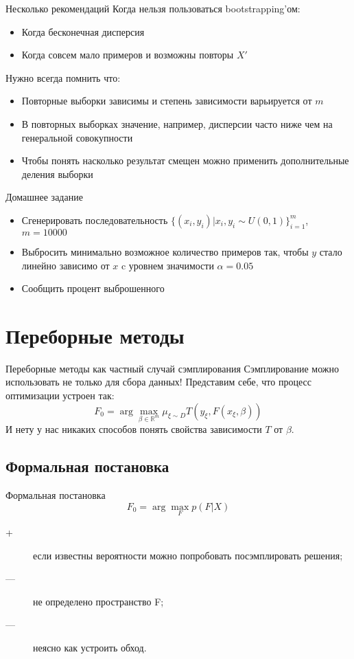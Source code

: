 \documentclass[14pt, fleqn, xcolor={dvipsnames, table}]{beamer}
\begin{document}
\begin{frame}{Несколько рекомендаций}
Когда нельзя пользоваться bootstrapping'ом:\small
\begin{itemize}
  \item Когда бесконечная дисперсия
  \item Когда совсем мало примеров и возможны повторы $X'$
\end{itemize}
\normalsize
Нужно всегда помнить что:\small
\begin{itemize}
  \item Повторные выборки зависимы и степень зависимости варьируется от $m$
  \item В повторных выборках значение, например, дисперсии часто ниже чем на генеральной совокупности
  \item Чтобы понять насколько результат смещен можно применить дополнительные деления выборки
\end{itemize}
\end{frame}

\begin{frame}{Домашнее задание}
\begin{itemize}
  \item Сгенерировать последовательность $\{(x_i, y_i)| x_i, y_i \sim U(0,1)\}_{i=1}^m$, $m=10000$
  \item Выбросить минимально возможное количество примеров так, чтобы $y$ стало линейно зависимо от $x$ c уровнем значимости $\alpha=0.05$
  \item Сообщить процент выброшенного
\end{itemize}
\end{frame}

\section{Переборные методы}

\begin{frame}{Переборные методы как частный случай сэмплирования}
Сэмплирование можно использовать не только для сбора данных! Представим себе, что процесс оптимизации устроен так:
$$
F_0 = \arg \max_{\beta \in \mathbb{R}^m} \mu_{\xi \sim D} T(y_{\xi}, F(x_{\xi}, \beta))
$$
И нету у нас никаких способов понять свойства зависимости $T$ от $\beta$.
\end{frame}

\subsection{Формальная постановка}
\begin{frame}{Формальная постановка}
$$
F_0 = \arg\max_F p(F|X)
$$
\begin{description}
  \item[\color{green}+] если известны вероятности можно попробовать посэмплировать решения;
  \item[\color{red}---] не определено пространство F;
  \item[\color{red}---] неясно как устроить обход.
\end{description}
\end{frame}
\end{document}
